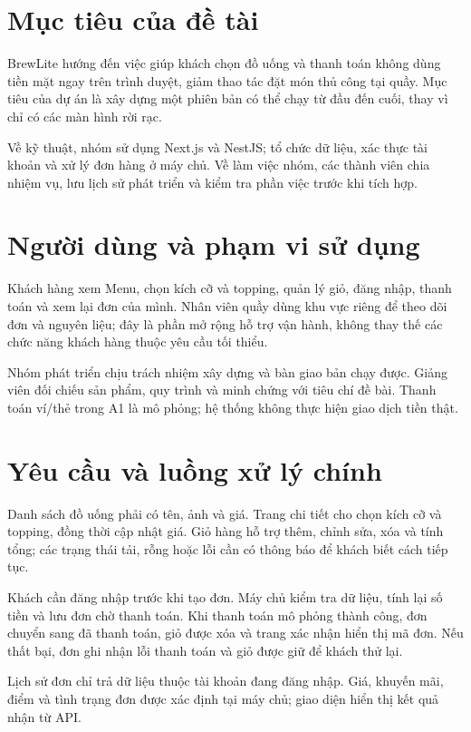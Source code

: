 \documentclass[12pt,a4paper]{report}
\begin{document}
\section{Mục tiêu của đề tài}

BrewLite hướng đến việc giúp khách chọn đồ uống và thanh toán không dùng tiền mặt ngay trên trình duyệt, giảm thao tác đặt món thủ công tại quầy. Mục tiêu của dự án là xây dựng một phiên bản có thể chạy từ đầu đến cuối, thay vì chỉ có các màn hình rời rạc.


Về kỹ thuật, nhóm sử dụng Next.js và NestJS; tổ chức dữ liệu, xác thực tài khoản và xử lý đơn hàng ở máy chủ. Về làm việc nhóm, các thành viên chia nhiệm vụ, lưu lịch sử phát triển và kiểm tra phần việc trước khi tích hợp.


\section{Người dùng và phạm vi sử dụng}

Khách hàng xem Menu, chọn kích cỡ và topping, quản lý giỏ, đăng nhập, thanh toán và xem lại đơn của mình. Nhân viên quầy dùng khu vực riêng để theo dõi đơn và nguyên liệu; đây là phần mở rộng hỗ trợ vận hành, không thay thế các chức năng khách hàng thuộc yêu cầu tối thiểu.


Nhóm phát triển chịu trách nhiệm xây dựng và bàn giao bản chạy được. Giảng viên đối chiếu sản phẩm, quy trình và minh chứng với tiêu chí đề bài. Thanh toán ví/thẻ trong A1 là mô phỏng; hệ thống không thực hiện giao dịch tiền thật.


\section{Yêu cầu và luồng xử lý chính}

Danh sách đồ uống phải có tên, ảnh và giá. Trang chi tiết cho chọn kích cỡ và topping, đồng thời cập nhật giá. Giỏ hàng hỗ trợ thêm, chỉnh sửa, xóa và tính tổng; các trạng thái tải, rỗng hoặc lỗi cần có thông báo để khách biết cách tiếp tục.


Khách cần đăng nhập trước khi tạo đơn. Máy chủ kiểm tra dữ liệu, tính lại số tiền và lưu đơn chờ thanh toán. Khi thanh toán mô phỏng thành công, đơn chuyển sang đã thanh toán, giỏ được xóa và trang xác nhận hiển thị mã đơn. Nếu thất bại, đơn ghi nhận lỗi thanh toán và giỏ được giữ để khách thử lại.


Lịch sử đơn chỉ trả dữ liệu thuộc tài khoản đang đăng nhập. Giá, khuyến mãi, điểm và tình trạng đơn được xác định tại máy chủ; giao diện hiển thị kết quả nhận từ API.
\end{document}
